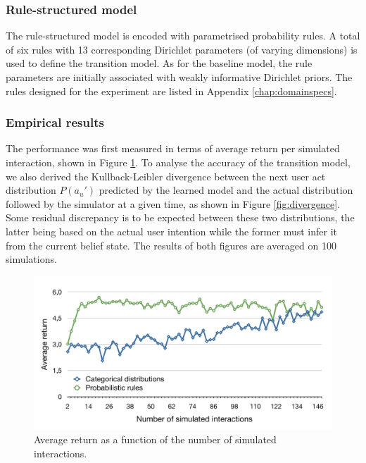 \subsubsection*{Rule-structured model}

The rule-structured model is encoded with parametrised probability rules. A total of six rules with 13 corresponding Dirichlet parameters (of varying dimensions) is used to define the transition model.   As for the baseline model, the rule parameters are initially associated with weakly informative Dirichlet priors.  The rules designed for the experiment are listed in Appendix \ref{chap:domainspecs}.

\subsubsection*{Empirical results}

The performance was first measured in terms of average return per simulated interaction, shown in Figure \ref{fig:return_exp21}.  To analyse the accuracy of the transition model, we also derived the Kullback-Leibler divergence \citep{KLDIVERGE} between the next user act distribution $P(a_u')$ predicted by the learned model and the actual distribution followed by the simulator at a given time, as shown in Figure \ref{fig:divergence}.   Some residual discrepancy is to be expected between these two distributions, the latter being based on the actual user intention while the former must infer it from the current belief state. The results of both figures are averaged on 100 simulations.

\begin{figure}[p]
\centering
\includegraphics[scale=0.42]{imgs/return_exp21.pdf}
\caption{Average return as a function of the number of simulated interactions.}
\label{fig:return_exp21}
\end{figure}

